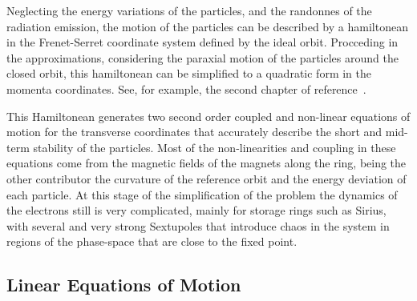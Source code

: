     Neglecting the energy variations of the particles, and the randonnes of the radiation emission, the motion of the particles can be described by a hamiltonean in the Frenet-Serret coordinate system defined by the ideal orbit. Procceding in the approximations, considering the paraxial motion of the particles around the closed orbit, this hamiltonean can be simplified to a quadratic form in the momenta coordinates. See, for example, the second chapter of reference~\cite[pp. 32]{Lee1999}.

    This Hamiltonean generates two second order coupled and non-linear equations of motion for the transverse coordinates that accurately describe the short and mid-term stability of the particles. Most of the non-linearities and coupling in these equations come from the magnetic fields of the magnets along the ring, being the other contributor the curvature of the reference orbit and the energy deviation of each particle. At this stage of the simplification of the problem the dynamics of the electrons still is very complicated, mainly for storage rings such as Sirius, with several and very strong Sextupoles that introduce chaos in the system in regions of the phase-space that are close to the fixed point.

\subsection{Linear Equations of Motion}

